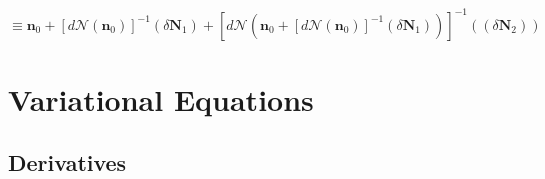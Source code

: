 \documentclass[aps,preprint]{revtex4}%
\begin{document}
\begin{equation}
\equiv\mathbf{n}_{0}+\left[  d\mathcal{N}\left(  \mathbf{n}_{0}\right)
\right]  ^{-1}\left(  \delta\mathbf{N}_{1}\right)  +\left[  d\mathcal{N}%
\left(  \mathbf{n}_{0}+\left[  d\mathcal{N}\left(  \mathbf{n}_{0}\right)
\right]  ^{-1}\left(  \delta\mathbf{N}_{1}\right)  \right)  \right]
^{-1}\left(  \left(  \delta\mathbf{N}_{2}\right)  \right)
\end{equation}


\section{Variational Equations\label{variational}}

\subsection{Derivatives}
\end{document}
